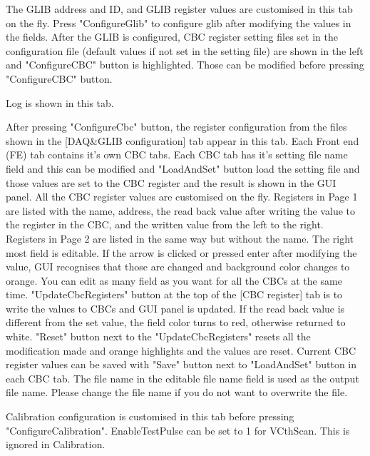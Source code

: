 \documentclass[11pt,a4paper]{article}
\begin{document}
	\begin{description}[style=nextline]
	\item[DAQ\&GLIB configuration] 
	The GLIB address and ID, and GLIB register values are customised in this tab on the fly.  Press "ConfigureGlib" to configure glib after modifying the values in the fields. After the GLIB is configured, CBC register setting files set in the configuration file (default values if not set in the setting file) are shown in the left and "ConfigureCBC" button is highlighted.  Those can be modified before pressing "ConfigureCBC" button. 
	\item[Log]
	Log is shown in this tab.
	\item[CBC register]
	After pressing "ConfigureCbc" button, the register configuration from the files shown in the 
	[DAQ\&GLIB configuration] tab appear in this tab. Each Front end (FE) tab contains it's own CBC tabs. 
	Each CBC tab has it's setting file name field and this can be modified and "LoadAndSet" button load the setting file and those values are set to the CBC register and the result is shown in the GUI panel.
	All the CBC register values are customised on the fly. 
	Registers in Page 1 are listed with the name, address, the read back value after writing the value to the register in the CBC, and the written value from the left to the right.  
	Registers in Page 2 are listed in the same way but without the name. The right most field is editable.  
	If the arrow is clicked or pressed enter after modifying the value, GUI recognises that those are changed and background color changes to orange.  
	You can edit as many field as you want for all the CBCs at the same time. 
	"UpdateCbcRegisters" button at the top of the [CBC register] tab is to write the values to CBCs and GUI panel is updated.
	If the read back value is different from the set value, the field color turns to red, otherwise returned to white.
	"Reset" button next to the "UpdateCbcRegisters"  resets all the modification made and orange highlights and the values are reset.
	Current CBC register values can be saved with "Save" button next to "LoadAndSet" button in each CBC tab.  
	The file name in the editable file name field is used as the output file name. Please change the file name if you do not want to overwrite the file.

	\item[Calibration configuration]
	Calibration configuration is customised in this tab before pressing "ConfigureCalibration".  
	EnableTestPulse can be set to 1 for VCthScan. This is ignored in Calibration.


\end{description}
\end{document}
